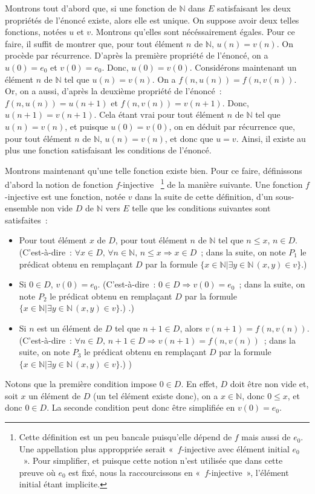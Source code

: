 Montrons tout d'abord que, si une fonction de $\mathbb{N}$ dans $E$ satisfaisant les deux propriétés de l'énoncé existe, alors elle est unique. 
On suppose avoir deux telles fonctions, notées $u$ et $v$. 
Montrons qu'elles sont nécéssairement égales. 
Pour ce faire, il suffit de montrer que, pour tout élément $n$ de $\mathbb{N}$, $u(n) = v(n)$. 
On procède par récurrence. 
D'après la première propriété de l'énoncé, on a $u(0) = e_0$ et $v(0) = e_0$. 
Donc, $u(0) = v(0)$. 
Considérons maintenant un élément $n$ de $\mathbb{N}$ tel que $u(n) = v(n)$. 
On a $f(n, u(n)) = f(n, v(n))$. 
Or, on a aussi, d'après la deuxième propriété de l'énoncé : $f(n, u(n)) = u(n+1)$ et $f(n, v(n)) = v(n+1)$. 
Donc, $u(n+1) = v(n+1)$. 
Cela étant vrai pour tout élément $n$ de $\mathbb{N}$ tel que $u(n) = v(n)$, et puisque $u(0) = v(0)$, on en déduit par récurrence que, pour tout élément $n$ de $\mathbb{N}$, $u(n) = v(n)$, et donc que $u = v$. 
Ainsi, il existe au plus une fonction satisfaisant les conditions de l'énoncé.

Montrons maintenant qu'une telle fonction existe bien. 
Pour ce faire, définissons d'abord la notion de fonction $f$-injective%
~\footnote{
    Cette définition est un peu bancale puisqu'elle dépend de $f$ mais aussi de $e_0$. 
    Une appellation plus approppriée serait « $f$-injective avec élément initial $e_0$ ». 
    Pour simplifier, et puisque cette notion n'est utilisée que dans cette preuve où $e_0$ est fixé, nous la raccourcissons en « $f$-injective », l'élément initial étant implicite.
}
de la manière suivante. 
Une fonction $f$-injective est une fonction, notée $v$ dans la suite de cette définition, d'un sous-ensemble non vide $D$ de $\mathbb{N}$ vers $E$ telle que les conditions suivantes sont satisfaites :
\begin{itemize}[nosep]
    \item Pour tout élément $x$ de $D$, pour tout élément $n$ de $\mathbb{N}$ tel que $n \leq x$, $n \in D$. 
        (C'est-à-dire : $\forall x \in D, \, \forall n \in \mathbb{N}, \, n \leq x \Rightarrow x \in D$ ; dans la suite, on note $P_1$ le prédicat obtenu en remplaçant $D$ par la formule $\lbrace x \in \mathbb{N} \vert \exists y \in \mathbb{N} \, (x,y) \in v \rbrace$.)
    \item Si $0 \in D$, $v(0) = e_0$.
        (C'est-à-dire : $0 \in D \Rightarrow v(0) = e_0$ ; dans la suite, on note $P_2$ le prédicat obtenu en remplaçant $D$ par la formule $\lbrace x \in \mathbb{N} \vert \exists y \in \mathbb{N} \, (x,y) \in v \rbrace$.)
.)
    \item Si $n$ est un élément de $D$ tel que $n+1 \in D$, alors $v(n+1) = f(n, v(n))$. 
        (C'est-à-dire : $\forall n \in D, \, n+1 \in D \Rightarrow v(n+1) = f(n, v(n))$ ; dans la suite, on note $P_3$ le prédicat obtenu en remplaçant $D$ par la formule $\lbrace x \in \mathbb{N} \vert \exists y \in \mathbb{N} \, (x,y) \in v \rbrace$.)
)
\end{itemize}
Notons que la première condition impose $0 \in D$. 
En effet, $D$ doit être non vide et, soit $x$ un élément de $D$ (un tel élément existe donc), on a $x \in \mathbb{N}$, donc $0 \leq x$, et donc $0 \in D$. 
La seconde condition peut donc être simplifiée en $v(0) = e_0$. 

